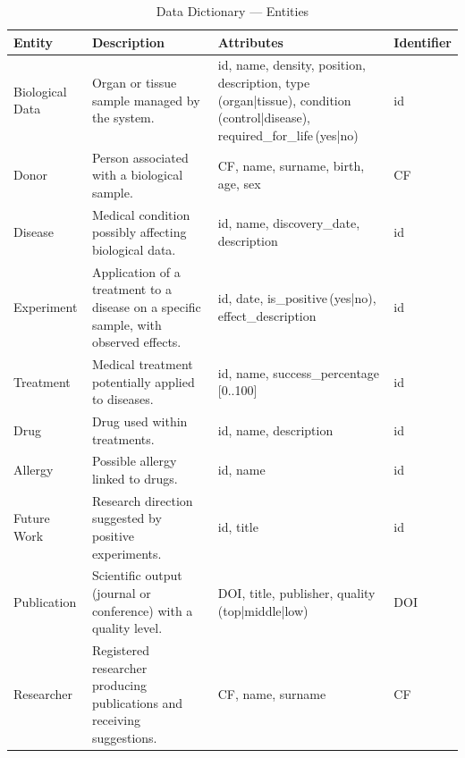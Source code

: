 \documentclass[11pt,a4paper]{article}
\begin{document}
\begin{table}[H]
\centering
\small
\renewcommand{\arraystretch}{1.2}
\begin{tabularx}{\textwidth}{|p{2.8cm}|X|X|p{2.2cm}|}
\hline
  \textbf{Entity} & \textbf{Description} & \textbf{Attributes} & \textbf{Identifier} \\
\hline
Biological Data & Organ or tissue sample managed by the system. & id, name, density, position, description, type\,(organ|tissue), condition\,(control|disease), required\_for\_life\,(yes|no) & id \\
\hline
Donor & Person associated with a biological sample. & CF, name, surname, birth, age, sex & CF \\
\hline
Disease & Medical condition possibly affecting biological data. & id, name, discovery\_date, description & id \\
\hline
Experiment & Application of a treatment to a disease on a specific sample, with observed effects. & id, date, is\_positive\,(yes|no), effect\_description & id \\
\hline
Treatment & Medical treatment potentially applied to diseases. & id, name, success\_percentage\,[0..100] & id \\
\hline
Drug & Drug used within treatments. & id, name, description & id \\
\hline
Allergy & Possible allergy linked to drugs. & id, name & id \\
\hline
Future Work & Research direction suggested by positive experiments. & id, title & id \\
\hline
Publication & Scientific output (journal or conference) with a quality level. & DOI, title, publisher, quality\,(top|middle|low) & DOI \\
\hline
Researcher & Registered researcher producing publications and receiving suggestions. & CF, name, surname & CF \\
\hline
\end{tabularx}
\caption{Data Dictionary — Entities}
\normalsize
\end{table}
\end{document}

